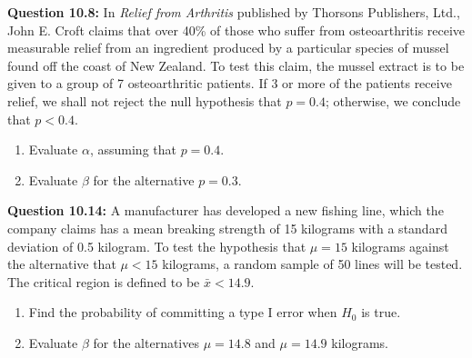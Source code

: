 \documentclass{article}
\begin{document}
\textbf{Question 10.8:}
In \textit{Relief from Arthritis} published by Thorsons
Publishers, Ltd., John E. Croft claims that over 40\%
of those who suffer from osteoarthritis receive 
measurable relief from an ingredient produced by a particular
species of mussel found off the coast of New Zealand.
To test this claim, the mussel extract is to be given to
a group of 7 osteoarthritic patients. If 3 or more of
the patients receive relief, we shall not reject the null
hypothesis that $p = 0.4$; otherwise, we conclude that
$p < 0.4$.
\begin{enumerate}[label=(\alph*)]
    \item Evaluate $\alpha$, assuming that $p = 0.4$.
    \item Evaluate $\beta$ for the alternative $p = 0.3$.
\end{enumerate}

\textbf{Question 10.14:}
A manufacturer has developed a new fishing
line, which the company claims has a mean breaking
strength of 15 kilograms with a standard deviation of
0.5 kilogram. To test the hypothesis that $\mu = 15$ 
kilograms against the alternative that $\mu < 15$ kilograms, a
random sample of 50 lines will be tested. The critical
region is defined to be $\bar{x} < 14.9$.
\begin{enumerate}[label=(\alph*)]
    \item Find the probability of committing a type I error
    when $H_0$ is true.
    \item Evaluate $\beta$ for the alternatives $\mu = 14.8$ and $\mu =
    14.9$ kilograms.
\end{enumerate}
\end{document}
